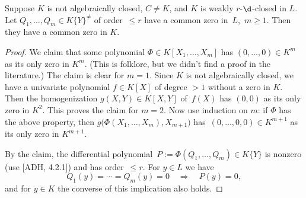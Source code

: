 \documentclass[10pt,a4paper]{amsart}
\renewcommand\ge{\geq}
\renewcommand\leq{\leqslant}
\begin{document}
\begin{lemma}
Suppose $K$ is not algebraically closed, $C\ne K$, and
$K$ is weakly $r$-$\d$-closed in $L$. Let $Q_1,\dots,Q_m\in K\{Y\}^{\neq}$ of order~$\leq r$ have a common zero
in~$L$,~$m\ge 1$. Then they have a common zero in $K$.
\end{lemma}

\begin{proof}
We claim that some polynomial $\Phi\in K[X_1,\dots,X_m]$ has $(0,\dots,0)\in K^m$ as its only
zero in $K^m$.
(This is folklore, but we didn't find a proof in the literature.)
The claim is clear for $m=1$. Since $K$ is not algebraically closed, we have a univariate polynomial $f\in K[X]$ of degree $>1$ 
 without a zero in $K$. %
Then the homogenization  $g(X,Y)\in K[X,Y]$
 of~$f(X)$ has $(0,0)$ as its only zero in $K^2$. 
This proves the claim for $m=2$. Now use induction on $m$: if $\Phi$ has the above property, then
 $g\big(\Phi(X_1, \ldots, X_{m}), X_{m+1}\big)$ has~$(0,\dots, 0,0)\in K^{m+1}$ as its only zero in $K^{m+1}$.


By the claim, the differential
polynomial~$P:=\Phi(Q_1,\dots,Q_m)\in K\{Y\}$ is nonzero (use [ADH, 4.2.1]) and
has order~$\leq r$. For $y\in L$ we have $$Q_1(y)=\cdots=Q_m(y)=0\quad \Longrightarrow\quad P(y)=0,$$
and for $y\in K$ the converse of this implication also holds. %
\end{proof}
\end{document}
